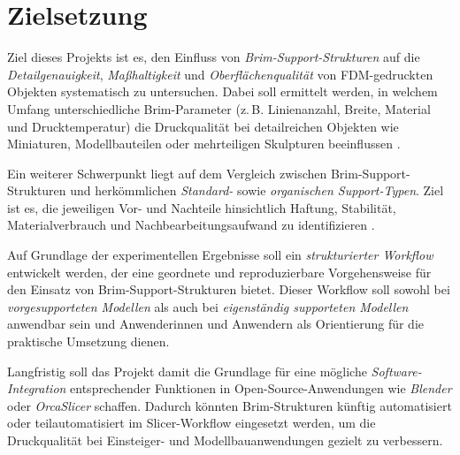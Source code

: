 \chapter{Zielsetzung}
\label{cha:Zielsetzung}

Ziel dieses Projekts ist es, den Einfluss von \textit{Brim-Support-Strukturen} auf die \textit{Detailgenauigkeit}, \textit{Maßhaltigkeit} und \textit{Oberflächenqualität} von FDM-gedruckten Objekten systematisch zu untersuchen. Dabei soll ermittelt werden, in welchem Umfang unterschiedliche Brim-Parameter (z.\,B. Linienanzahl, Breite, Material und Drucktemperatur) die Druckqualität bei detailreichen Objekten wie Miniaturen, Modellbauteilen oder mehrteiligen Skulpturen beeinflussen \cite{Kristiawan2021, FDMReview2021, FFFPolymerReview}.  

Ein weiterer Schwerpunkt liegt auf dem Vergleich zwischen Brim-Support-Strukturen und herkömmlichen \textit{Standard-} sowie \textit{organischen Support-Typen}. Ziel ist es, die jeweiligen Vor- und Nachteile hinsichtlich Haftung, Stabilität, Materialverbrauch und Nachbearbeitungsaufwand zu identifizieren \cite{Facfox2023, JLC3DP2023}.  

Auf Grundlage der experimentellen Ergebnisse soll ein \textit{strukturierter Workflow} entwickelt werden, der eine geordnete und reproduzierbare Vorgehensweise für den Einsatz von Brim-Support-Strukturen bietet. Dieser Workflow soll sowohl bei \textit{vorgesupporteten Modellen} als auch bei \textit{eigenständig supporteten Modellen} anwendbar sein und Anwenderinnen und Anwendern als Orientierung für die praktische Umsetzung dienen.  

Langfristig soll das Projekt damit die Grundlage für eine mögliche \textit{Software-Integration} entsprechender Funktionen in Open-Source-Anwendungen wie \textit{Blender} oder \textit{OrcaSlicer} schaffen. Dadurch könnten Brim-Strukturen künftig automatisiert oder teilautomatisiert im Slicer-Workflow eingesetzt werden, um die Druckqualität bei Einsteiger- und Modellbauanwendungen gezielt zu verbessern.